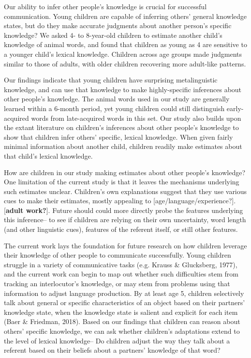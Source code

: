 \documentclass[10pt, letterpaper]{article}
\begin{document}
Our ability to infer other people's knowledge is crucial for successful
communication. Young children are capable of inferring others' general
knowledge states, but do they make accurate judgments about another
person's specific knowledge? We asked 4- to 8-year-old children to
estimate another child's knowledge of animal words, and found that
children as young as 4 are sensitive to a younger child's lexical
knowledge. Children across age groups made judgments similar to those of
adults, with older children recovering more adult-like patterns.

Our findings indicate that young children have surprising metalinguistic
knowledge, and can use that knowledge to make highly-specific inferences
about other people's knowledge. The animal words used in our study are
generally learned within a 6-month period, yet young children could
still distinguish early-acquired words from late-acquired words in this
set. Our study also builds upon the extant literature on children's
inferences about other people's knowledge to show that children infer
others' specific, lexical knowledge. When given fairly minimal
information about another child, children readily make estimates about
that child's lexical knowledge.

How are children in our study making estimates about other people's
knowledge? One limitation of the current study is that it leaves the
mechanisms underlying such estimates unclear. Children's own
explanations suggest that they use various cues to make their estimates,
mostly appealing to {[}age/language/experience?{]}. {[}\textbf{adult
work?}{]}. Future should could more directly probe the features
underlying this inference-- to see if children are relying on their own
uncertainty, word length (and other linguistic cues), features of the
referent itself, or still other features.

The current work lays the foundation for future research on how children
leverage their knowledge of other people to communicate successfully.
Young children struggle in a variety of communicative tasks (e.g. Krauss
\& Glucksberg, 1977), and the current work can begin to map out whether
such difficulties stem from tracking an interlocutor's knowledge, or may
stem from problems using that information to adjust language production.
By at least age 5, children selectively talk about general or specific
characteristics of an object based on their partners' knowledge state,
when the knowledge state is salient and explicit for each item (Baer \&
Friedman, 2018). Based on our findings that children can reason about
others' specific knowledge, we can ask whether children's adaptations
extend to the level of lexical knowledge-- Do children adjust the way
they talk about a referent based on their beliefs about a partners'
knowledge of that word?
\end{document}
